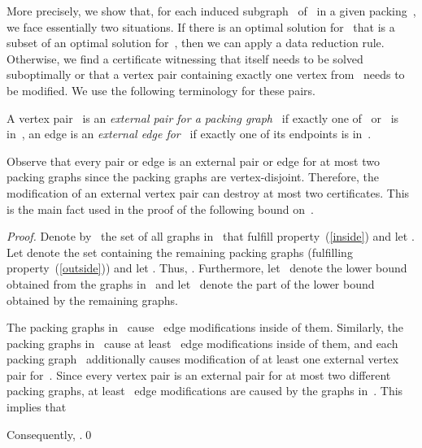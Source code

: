 \documentclass[envcountsame,numbook,smallextended]{svjour3}
\numberwithin{equation}{section}
\numberwithin{figure}{section}
\newcommand{\tffedv}{\textsc{-free Editing with Cost- Packing}}
\begin{document}
More precisely, we show that, for each induced
subgraph~ of~ in a given packing~, we face
essentially two situations. If there is an optimal solution for~
that is a subset of an optimal solution for~, then we can apply a data reduction rule. Otherwise, we find a
certificate witnessing that  itself needs to be solved
suboptimally or that a vertex pair containing exactly
one vertex from~ needs to be modified. We use the following terminology for these pairs. 
\begin{definition}A vertex pair~ is an \emph{external pair for a packing graph~} if exactly one of~ or~
  is in~, an edge is an \emph{external edge for~} if exactly one of its endpoints
  is in~. 
\end{definition}
Observe that every pair or edge is an external pair or edge for at most two packing graphs
since the packing graphs are vertex-disjoint. Therefore, the modification of an external vertex
pair can destroy at most two certificates.
This is the main fact used in the proof of the
following bound on~.



\begin{proof}
    Denote by~ the set of all graphs in~ that fulfill
  property~(\ref{inside}) and let .
  Let  denote the
  set containing the remaining packing graphs (fulfilling property~(\ref{outside})) and let .
  Thus, .
  Furthermore, let ~denote the lower bound obtained from the graphs in~ and let ~denote the part of the lower bound obtained by the remaining graphs.

  The packing graphs in~ cause~ edge modifications inside of them. Similarly, the packing graphs in~ cause at least~ edge modifications inside of them, and each packing graph~ additionally causes modification of at least one external vertex pair for~. Since every vertex pair is an external pair for at most two different packing graphs, at least~ edge modifications are caused by the graphs in~.  This implies that
  
Consequently,   .\qed
\end{proof}
\end{document}
